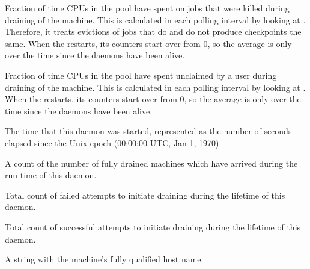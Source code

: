 \begin{description}

\item[\AdAttr{AvgDrainingBadput}:] Fraction of time CPUs
  in the pool have spent on jobs that were killed during draining of the
  machine.  This is calculated in each polling interval by looking
  at .  
  Therefore, it treats evictions of jobs that do and do not produce
  checkpoints the same.
  When the  restarts, its counters start over from 0, so the
  average is only over the time since the daemons have been alive.

\item[\AdAttr{AvgDrainingUnclaimedTime}:] Fraction of time CPUs
  in the pool have spent unclaimed by a user during
  draining of the machine.  This is calculated in each polling interval
  by looking at .  
  When the  restarts, its counters start over from 0, so the
  average is only over the time since the daemons have been alive.

\item[\AdAttr{DaemonStartTime}:] The time that this daemon was started, 
  represented as the number of seconds elapsed since
  the Unix epoch (00:00:00 UTC, Jan 1, 1970).

\item[\AdAttr{DrainedMachines}:] A count of the number of fully drained 
machines which have arrived during the run time of this  daemon.

\item[\AdAttr{DrainFailures}:] Total count of failed attempts
  to initiate draining during the lifetime of this  daemon.

\item[\AdAttr{DrainSuccesses}:] Total count of successful attempts
  to initiate draining during the lifetime of this  daemon.

\item[\AdAttr{Machine}:] A string with the machine's fully qualified 
  host name.


\end{description}
